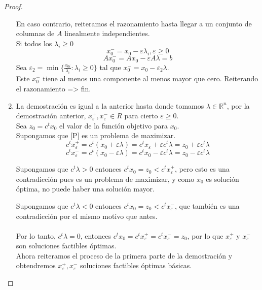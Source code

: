 \documentclass[11pt,fleqn]{book} %
\begin{document}
\begin{proof}
\begin{enumerate}
	En caso contrario, reiteramos el razonamiento hasta llegar a un conjunto de columnas de $A$ linealmente independientes. \\
	Si todos los $\lambda_i \geq 0$ \\
	$$
		x_0^-=x_0-\varepsilon \lambda_i, \varepsilon \geq 0
	$$
	$$
		Ax_0^-=Ax_0-\varepsilon A \lambda = b
	$$
	Sea $\varepsilon_2=\min\{ \frac{x_{0i}}{\lambda_i} : \lambda_i \geq 0 \}$ tal que $x_0^-=x_0- \varepsilon_2 \lambda$. \\
	Este $x_0^-$ tiene al menos una componente al menos mayor que cero. Reiterando el razonamiento => fin.
	\item La demostración es igual a la anterior hasta donde tomamos $\lambda \in \mathbb{R}^n$, por la demostración anterior, $x_\varepsilon^+, x_\varepsilon^- \in R$ para cierto $\varepsilon \geq 0$. \\
	Sea $z_0=c^t x_0$ el valor de la función objetivo para $x_0$. \\
	Supongamos que [P] es un problema de maximizar.
	$$
		c^t x_\varepsilon^+=c^t(x_0+\varepsilon \lambda)=c^tx_\varepsilon+\varepsilon c^t \lambda=z_0+\varepsilon c^t \lambda
	$$
	$$
		c^t x_\varepsilon^-=c^t(x_0-\varepsilon  \lambda)=c^t x_0-\varepsilon c^t \lambda = z_0- \varepsilon c^t\lambda
	$$
	 \par 
	Supongamos que $c^t \lambda >0$ entonces $c^t x_0=z_0< c^t x_\varepsilon^+$, pero esto es una contradicción pues es un problema de maximizar, y como $x_0$ es solución óptima, no puede haber una solución mayor. \\
	 \par 
	Supongamos que $c^t \lambda < 0$ entonces $c^tx_0=z_0<c^tx_\varepsilon^-$, que también es una contradicción por el mismo motivo que antes. \\
	\\
	Por lo tanto, $c^t \lambda = 0$, entonces $c^t x_0=c^t x_\varepsilon^+=c^t x_\varepsilon^-=z_0$, por lo que $x_\varepsilon^+$ y $x_\varepsilon^-$ son soluciones factibles óptimas. \\
	Ahora reiteramos el proceso de la primera parte de la demostración y obtendremos $x_\varepsilon^+, x_\varepsilon^-$ soluciones factibles óptimas básicas.
\end{enumerate}
\end{proof}
\end{document}
